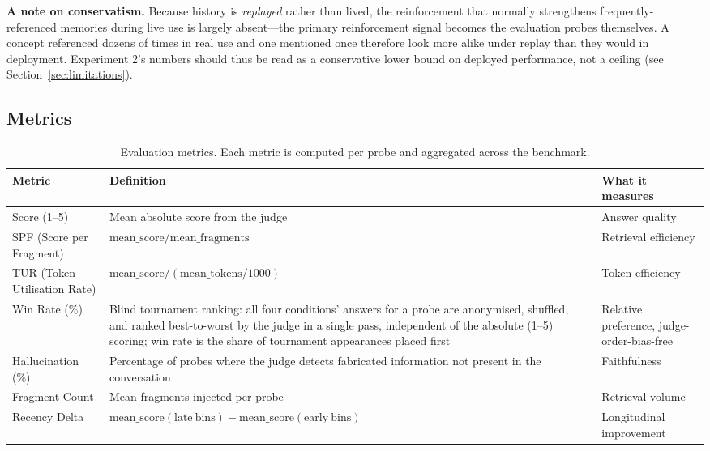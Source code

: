 \documentclass[11pt,a4paper]{article}
\begin{document}
\textbf{A note on conservatism.} Because history is \emph{replayed} rather than lived, the reinforcement that normally strengthens frequently-referenced memories during live use is largely absent---the primary reinforcement signal becomes the evaluation probes themselves. A concept referenced dozens of times in real use and one mentioned once therefore look more alike under replay than they would in deployment. Experiment 2's numbers should thus be read as a conservative lower bound on deployed performance, not a ceiling (see Section~\ref{sec:limitations}).

\subsection{Metrics}

\begin{table}[htbp]
\centering
\small
\caption{Evaluation metrics. Each metric is computed per probe and aggregated across the benchmark.}
\label{tab:metrics}
\begin{tabular}{p{}p{}p{}}
\toprule
\textbf{Metric} & \textbf{Definition} & \textbf{What it measures} \\
\midrule
Score (1--5) & Mean absolute score from the judge & Answer quality \\
SPF (Score per Fragment) & $\mathrm{mean\_score} / \mathrm{mean\_fragments}$ & Retrieval efficiency \\
TUR (Token Utilisation Rate) & $\mathrm{mean\_score} / (\mathrm{mean\_tokens}/1000)$ & Token efficiency \\
Win Rate (\%) & Blind tournament ranking: all four conditions' answers for a probe are anonymised, shuffled, and ranked best-to-worst by the judge in a single pass, independent of the absolute (1--5) scoring; win rate is the share of tournament appearances placed first & Relative preference, judge-order-bias-free \\
Hallucination (\%) & Percentage of probes where the judge detects fabricated information not present in the conversation & Faithfulness \\
Fragment Count & Mean fragments injected per probe & Retrieval volume \\
Recency Delta & $\mathrm{mean\_score}(\mathrm{late\ bins}) - \mathrm{mean\_score}(\mathrm{early\ bins})$ & Longitudinal improvement \\
\bottomrule
\end{tabular}
\end{table}
\end{document}
